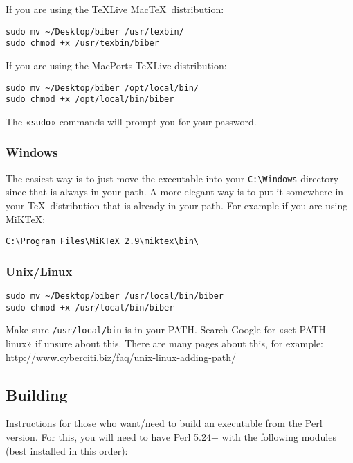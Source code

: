 \documentclass{ltxdockit}
\begin{document}
If you are using the \TeX Live Mac\TeX\ distribution:

\begin{verbatim}
sudo mv ~/Desktop/biber /usr/texbin/
sudo chmod +x /usr/texbin/biber
\end{verbatim}

\noindent If you are using the MacPorts \TeX Live distribution:

\begin{verbatim}
sudo mv ~/Desktop/biber /opt/local/bin/
sudo chmod +x /opt/local/bin/biber
\end{verbatim}

\noindent The «\verb+sudo+» commands will prompt you for your password.

\subsubsection{Windows}

The easiest way is to just move the executable into your \verb+C:\Windows+ directory since
that is always in your path. A more elegant way is to put it somewhere in
your \TeX\ distribution that is already in your path. For example if you
are using MiK\TeX:

\begin{verbatim}
C:\Program Files\MiKTeX 2.9\miktex\bin\
\end{verbatim}

\subsubsection{Unix/Linux}

\begin{verbatim}
sudo mv ~/Desktop/biber /usr/local/bin/biber
sudo chmod +x /usr/local/bin/biber
\end{verbatim}

\noindent Make sure \verb+/usr/local/bin+ is in your PATH. Search Google for «set PATH
linux» if unsure about this. There are many pages about this, for example:
\url{http://www.cyberciti.biz/faq/unix-linux-adding-path/}

\subsection{Building}

Instructions for those who want/need to build an executable from the
Perl version. For this, you will need to have Perl 5.24+ with
the following modules (best installed in this order):
\end{document}
